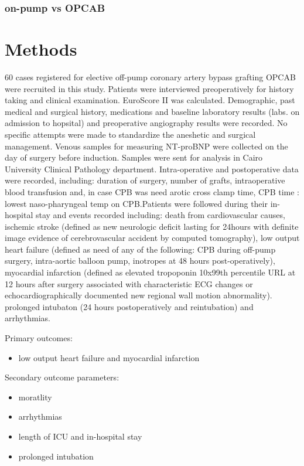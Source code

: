\documentclass[14pt,a4paper,onecolumn]{extarticle}
\begin{document}
\subsubsection{on-pump vs OPCAB}


\clearpage
\section{Methods}


60 cases registered for elective off-pump coronary artery bypass grafting OPCAB were recruited in this study. Patients were interviewed preoperatively for history taking and clinical examination. EuroScore II was calculated. Demographic, past medical and surgical history, medications and baseline laboratory results (labs. on admission to hopsital) and preoperative angiography results were recorded.  No specific attempts were made to standardize the aneshetic and surgical management.  Venous samples for measuring NT-proBNP were collected on the day of surgery before induction. Samples were sent for analysis in Cairo University Clinical Pathology department. Intra-operative and postoperative data were recorded, including: duration of surgery, number of grafts, intraoperative blood transfusion and, in case CPB was need arotic cross clamp time, CPB time : lowest naso-pharyngeal temp on CPB.Patients were followed during their in-hospital stay and events recorded including: death from cardiovascular causes, ischemic stroke (defined as new neurologic deficit lasting for  24hours with definite image evidence of cerebrovascular accident by computed tomography), low output heart failure (defined as need of any of the following: CPB during off-pump surgery, intra-aortic balloon pump, inotropes at 48 hours post-operatively),  myocardial infarction (defined as elevated tropoponin 10x99th percentile URL at 12 hours after surgery associated with characteristic ECG changes or echocardiographically documented new regional wall motion abnormality). prolonged intubaton (24 hours postoperatively and reintubation) and arrhythmias.

Primary outcomes:
    \begin{itemize}
        \item low output heart failure and myocardial infarction
    \end{itemize}

Secondary outcome parameters:
    \begin{itemize}
        \item moratlity
        \item arrhythmias
        \item length of ICU and in-hospital stay
        \item prolonged intubation
    \end{itemize}
\end{document}
